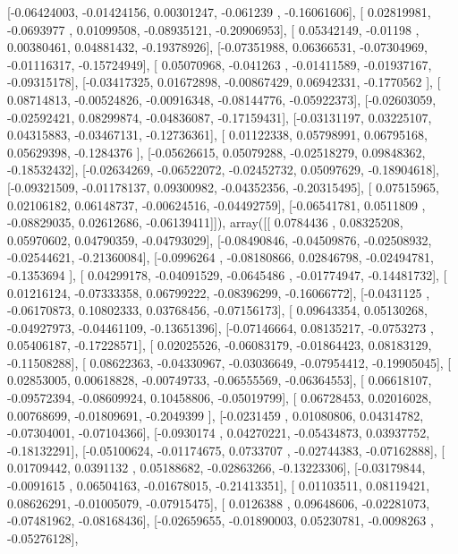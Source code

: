 \documentclass{article}
\begin{document}
       [-0.06424003, -0.01424156,  0.00301247, -0.061239  , -0.16061606],
       [ 0.02819981, -0.0693977 ,  0.01099508, -0.08935121, -0.20906953],
       [ 0.05342149, -0.01198   ,  0.00380461,  0.04881432, -0.19378926],
       [-0.07351988,  0.06366531, -0.07304969, -0.01116317, -0.15724949],
       [ 0.05070968, -0.041263  , -0.01411589, -0.01937167, -0.09315178],
       [-0.03417325,  0.01672898, -0.00867429,  0.06942331, -0.1770562 ],
       [ 0.08714813, -0.00524826, -0.00916348, -0.08144776, -0.05922373],
       [-0.02603059, -0.02592421,  0.08299874, -0.04836087, -0.17159431],
       [-0.03131197,  0.03225107,  0.04315883, -0.03467131, -0.12736361],
       [ 0.01122338,  0.05798991,  0.06795168,  0.05629398, -0.1284376 ],
       [-0.05626615,  0.05079288, -0.02518279,  0.09848362, -0.18532432],
       [-0.02634269, -0.06522072, -0.02452732,  0.05097629, -0.18904618],
       [-0.09321509, -0.01178137,  0.09300982, -0.04352356, -0.20315495],
       [ 0.07515965,  0.02106182,  0.06148737, -0.00624516, -0.04492759],
       [-0.06541781,  0.0511809 , -0.08829035,  0.02612686, -0.06139411]]), array([[ 0.0784436 ,  0.08325208,  0.05970602,  0.04790359, -0.04793029],
       [-0.08490846, -0.04509876, -0.02508932, -0.02544621, -0.21360084],
       [-0.0996264 , -0.08180866,  0.02846798, -0.02494781, -0.1353694 ],
       [ 0.04299178, -0.04091529, -0.0645486 , -0.01774947, -0.14481732],
       [ 0.01216124, -0.07333358,  0.06799222, -0.08396299, -0.16066772],
       [-0.0431125 , -0.06170873,  0.10802333,  0.03768456, -0.07156173],
       [ 0.09643354,  0.05130268, -0.04927973, -0.04461109, -0.13651396],
       [-0.07146664,  0.08135217, -0.0753273 ,  0.05406187, -0.17228571],
       [ 0.02025526, -0.06083179, -0.01864423,  0.08183129, -0.11508288],
       [ 0.08622363, -0.04330967, -0.03036649, -0.07954412, -0.19905045],
       [ 0.02853005,  0.00618828, -0.00749733, -0.06555569, -0.06364553],
       [ 0.06618107, -0.09572394, -0.08609924,  0.10458806, -0.05019799],
       [ 0.06728453,  0.02016028,  0.00768699, -0.01809691, -0.2049399 ],
       [-0.0231459 ,  0.01080806,  0.04314782, -0.07304001, -0.07104366],
       [-0.0930174 ,  0.04270221, -0.05434873,  0.03937752, -0.18132291],
       [-0.05100624, -0.01174675,  0.0733707 , -0.02744383, -0.07162888],
       [ 0.01709442,  0.0391132 ,  0.05188682, -0.02863266, -0.13223306],
       [-0.03179844, -0.0091615 ,  0.06504163, -0.01678015, -0.21413351],
       [ 0.01103511,  0.08119421,  0.08626291, -0.01005079, -0.07915475],
       [ 0.0126388 ,  0.09648606, -0.02281073, -0.07481962, -0.08168436],
       [-0.02659655, -0.01890003,  0.05230781, -0.0098263 , -0.05276128],
\end{document}
